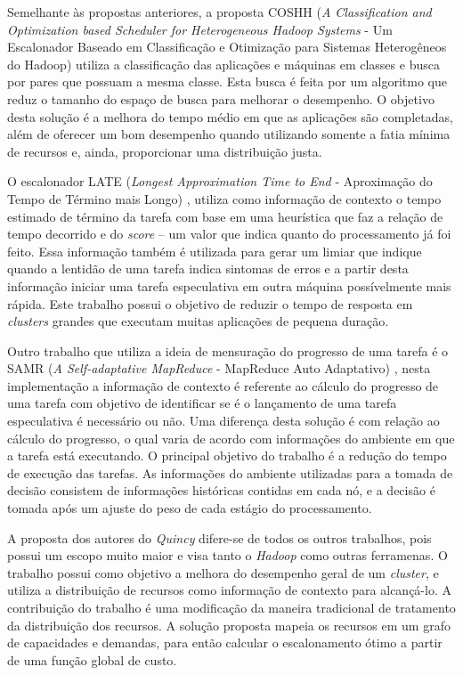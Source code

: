 Semelhante às propostas anteriores, a proposta COSHH (\textit{A Classification and Optimization based Scheduler for Heterogeneous Hadoop Systems} - Um Escalonador Baseado em Classificação e Otimização para Sistemas Heterogêneos do Hadoop) \cite{COSHH} utiliza a classificação das aplicações e máquinas em classes e busca por pares que possuam a mesma classe. Esta busca é feita por um algoritmo que reduz o tamanho do espaço de busca para melhorar o desempenho. O objetivo desta solução é a melhora do tempo médio em que as aplicações são completadas, além de oferecer um bom desempenho quando utilizando somente a fatia mínima de recursos e, ainda, proporcionar uma distribuição justa.

O escalonador LATE (\textit{Longest Approximation Time to End} - Aproximação do Tempo de Término mais Longo) \cite{LATE}, utiliza como informação de contexto o tempo estimado de término da tarefa com base em uma heurística que faz a relação de tempo decorrido e do \textit{score} -- um valor que indica quanto do processamento já foi feito. Essa informação também é utilizada para gerar um limiar que indique quando a lentidão de uma tarefa indica sintomas de erros e a partir desta informação iniciar uma tarefa especulativa em outra máquina possívelmente mais rápida. Este trabalho possui o objetivo de reduzir o tempo de resposta em \textit{clusters} grandes que executam muitas aplicações de pequena duração.

Outro trabalho que utiliza a ideia de mensuração do progresso de uma tarefa é o SAMR (\textit{A Self-adaptative MapReduce} - MapReduce Auto Adaptativo) \cite{SAMR}, nesta implementação a informação de contexto é referente ao cálculo do progresso de uma tarefa com objetivo de identificar se é o lançamento de uma tarefa especulativa é necessário ou não. Uma diferença desta solução é com relação ao cálculo do progresso, o qual varia de acordo com informações do ambiente em que a tarefa está executando. O principal objetivo do trabalho é a redução do tempo de execução das tarefas. As informações do ambiente utilizadas para a tomada de decisão consistem de informações históricas contidas em cada nó, e a decisão é tomada após um ajuste do peso de cada estágio do processamento.


A proposta dos autores do \textit{Quincy} \cite{Quincy} difere-se de todos os outros trabalhos, pois possui um escopo muito maior e visa tanto o \textit{Hadoop} como outras ferramenas. O trabalho possui como objetivo a melhora do desempenho geral de um \textit{cluster}, e utiliza a distribuição de recursos como informação de contexto para alcançá-lo. A contribuição do trabalho é uma modificação da maneira tradicional de tratamento da distribuição dos recursos. A solução proposta mapeia os recursos em um grafo de capacidades e demandas, para então calcular o escalonamento ótimo a partir de uma função global de custo.

